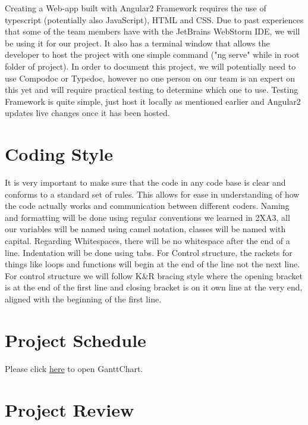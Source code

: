 \documentclass{article}
\begin{document}
Creating a Web-app built with Angular2 Framework requires the use of typescript (potentially also JavaScript), HTML and CSS. Due to past experiences that some of the team members have with the JetBrains WebStorm IDE, we will be using it for our project. It also has a terminal window that allows the developer to host the project with one simple command ("ng serve" while in root folder of project). In order to document this project, we will potentially need to use Compodoc or Typedoc, however no one person on our team is an expert on this yet and will require practical testing to determine which one to use. Testing Framework is quite simple, just host it locally as mentioned earlier and Angular2 updates live changes once it has been hosted. 

\section{Coding Style}
It is very important to make sure that the code in any code base is clear and conforms to a standard set of rules. This allows for ease in understanding of how the code actually works and communication between different coders. Naming and formatting will be done using regular conventions we learned in 2XA3, all our variables will be named using camel notation, classes will be named with capital. Regarding Whitespaces, there will be no whitespace after the end of a line. Indentation will be done using tabs. For Control structure, the rackets for things like loops and functions will begin at the end of the line not the next line. For control structure we will follow K\&R bracing style where the opening bracket is at the end of the first line and closing bracket is on it own line at the very end, aligned with the beginning of the first line. 

\section{Project Schedule}
Please click \href{run:./GanttChart/GanttChart.gan}{here} to open GanttChart.

\section{Project Review}
\end{document}
